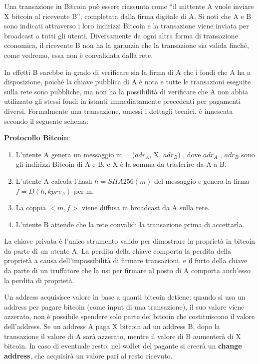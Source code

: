 Una transazione in Bitcoin può essere riassunta come “il mittente A vuole inviare X bitcoin al ricevente B”, completata dalla ﬁrma digitale di A. Si noti che A e B sono indicati attraverso i loro indirizzi Bitcoin e la transazione viene inviata per broadcast a tutti gli utenti. Diversamente da ogni altra forma di transazione economica, il ricevente B non ha la garanzia che la transazione sia valida ﬁnché, come vedremo, essa non è convalidata dalla rete. 

In effetti B sarebbe in grado di veriﬁcare sia la ﬁrma di A che i fondi che A ha a disposizione, poiché la chiave pubblica di A è nota e tutte le transazioni eseguite sulla rete sono pubbliche, ma non ha la possibilità di veriﬁcare che A non abbia utilizzato gli stessi fondi in istanti immediatamente precedenti per pagamenti diversi. Formalmente una transazione, omessi i dettagli tecnici, è innescata secondo il seguente schema:
\begin{center}
\textbf{Protocollo Bitcoin}:
\begin{enumerate}
    \item L’utente A genera un messaggio m = ($adr_A$, X, $adr_B$) , dove $adr_A$ , $adr_B$ sono gli indirizzi Bitcoin di A e B, e X è la somma da trasferire da A a B.
    \item L’utente A calcola l’hash $h = SHA256(m)$ del messaggio e genera la ﬁrma $f = D(h, kprv_A)$ per m.
    \item La coppia $<m, f>$ viene diffusa in broadcast da A sulla rete.
    \item L’utente B attende che la rete convalidi la transazione prima di accettarla.
\end{enumerate}
\end{center}

La chiave privata è l’unico strumento valido per dimostrare la proprietà in bitcoin da parte di un utente A.
La perdita della chiave comporta la perdita della proprietà a causa dell’impossibilità di ﬁrmare transazioni, e il furto della chiave da parte di un truﬀatore che la usi per ﬁrmare al posto di A comporta anch’esso la perdita di proprietà.

Un address acquisisce valore in base a quanti bitcoin detiene; quando si usa un address per pagare bitcoin (come input di una transazione), il suo valore viene azzerato, non è possibile spendere solo parte dei bitcoin che costituiscono il valore dell’address. Se un address A paga X bitcoin ad un address B, dopo la transazione il valore di A sarà azzerato, mentre il valore di B aumenterà di X bitcoin. In caso di eventuale resto, nel wallet del pagante si creerà un \textbf{change address}, che acquisirà un valore pari al resto ricevuto.


